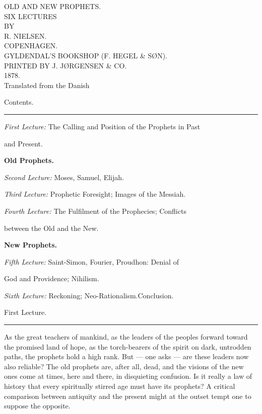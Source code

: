 \documentclass[12pt,a4paper,openany]{book}
\newcommand{\opage}[1]{\marginnote{\footnotesize\textit{[#1]}}}
\newcommand{\lecture}[1]{\clearpage\begin{center}{\large #1}\\[0.4em]\rule{3em}{0.4pt}\end{center}\medskip\noindent}
\begin{document}
\begin{titlepage}
\begin{center}
\vspace*{3em}
{\Huge OLD AND NEW PROPHETS.}\\[2.5em]
SIX LECTURES\\[1em]
{\small BY}\\[1em]
{\large R. NIELSEN.}\\[5em]
COPENHAGEN.\\[0.5em]
GYLDENDAL'S BOOKSHOP (F. HEGEL \& SØN).\\[0.5em]
{\small PRINTED BY J. JØRGENSEN \& CO.}\\[0.5em]
{\small 1878.}\\[3em]
{\small Translated from the Danish}
\end{center}
\end{titlepage}

\begin{center}{\large Contents.}\\[0.3em]\rule{3em}{0.4pt}\end{center}
\noindent\emph{First Lecture:} The Calling and Position of the Prophets in Past\par
\noindent\hspace*{2em}and Present.\par
\begin{center}\textbf{Old Prophets.}\end{center}
\noindent\emph{Second Lecture:} Moses, Samuel, Elijah.\par
\noindent\emph{Third Lecture:} Prophetic Foresight; Images of the Messiah.\par
\noindent\emph{Fourth Lecture:} The Fulfilment of the Prophecies; Conflicts\par
\noindent\hspace*{2em}between the Old and the New.\par
\begin{center}\textbf{New Prophets.}\end{center}
\noindent\emph{Fifth Lecture:} Saint-Simon, Fourier, Proudhon: Denial of\par
\noindent\hspace*{2em}God and Providence; Nihilism.\par
\noindent\emph{Sixth Lecture:} Reckoning; Neo-Rationalism.\enspace Conclusion.\par
\clearpage

\setcounter{footnote}{0}%
\lecture{First Lecture.}\opage{1}As the great teachers of mankind, as the leaders of the peoples
forward toward the promised land of hope, as the torch-bearers of the spirit
on dark, untrodden paths, the prophets hold a high rank. But --- one asks --- are these
leaders now also reliable? The old prophets are, after all,
dead, and the visions of the new ones come at times, here and there,
in disquieting confusion. Is it really a law of history
that every spiritually stirred age must have
its prophets? A critical comparison between antiquity
and the present might at the outset tempt one to suppose
the opposite.
\end{document}
